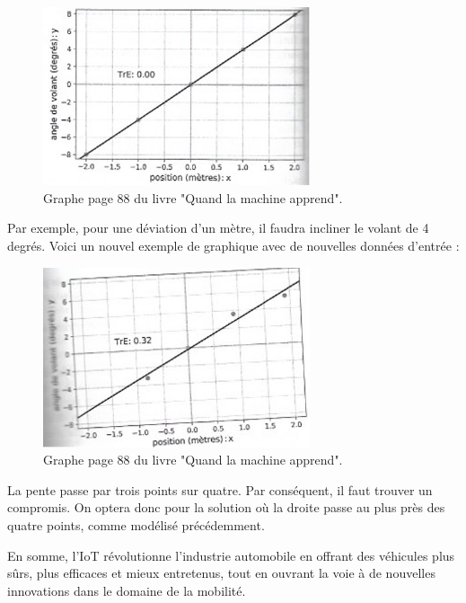 \documentclass{article}
\begin{document}
\begin{figure}[h]
    \centering
    \includegraphics[width=0.7\textwidth]{images/graph1_yannLeCun.png} 
    \caption{Graphe page 88 du livre "Quand la machine apprend".}
\end{figure}

Par exemple, pour une déviation d’un mètre, il faudra incliner le volant de 4 degrés. 
Voici un nouvel exemple de graphique avec de nouvelles données d’entrée :

\begin{figure}[h]
    \centering
    \includegraphics[width=0.7\textwidth]{images/graph2_yannLeCun.jpg} 
    \caption{Graphe page 88 du livre "Quand la machine apprend".}
\end{figure}

La pente passe par trois points sur quatre. Par conséquent, il faut trouver un compromis. On optera donc pour la solution où la droite passe au plus près des quatre points, comme modélisé précédemment. 




En somme, l’IoT révolutionne l’industrie automobile en offrant des véhicules plus sûrs, plus efficaces et mieux entretenus, tout en ouvrant la voie à de nouvelles innovations dans le domaine de la mobilité.
\end{document}
